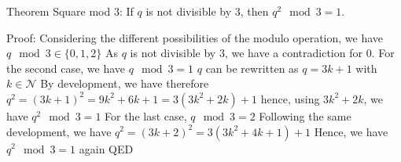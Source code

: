 Theorem Square mod 3:
If $q$ is not divisible by $3$, then $q^2 \mod 3 = 1$.


Proof:
Considering the different possibilities of the modulo operation, we have $q \mod 3 \in \{ 0, 1, 2 \}$
As $q$ is not divisible by $3$, we have a contradiction for $0$.
For the second case, we have $q \mod 3 = 1$
    $q$ can be rewritten as $q = 3k + 1$ with $k \in \mathcal{N}$
    By development, we have therefore $q^2 = (3k+1)^2 = 9k^2+6k+1 = 3(3k^2 + 2k) + 1$
    hence, using $3k^2 + 2k$, we have $q^2 \mod 3 = 1$
For the last case, $q \mod 3 = 2$
    Following the same development, we have $q^2 = (3k+2)^2 = 3(3k^2+4k+1) +1$
    Hence, we have $q^2 \mod 3 = 1$ again
QED